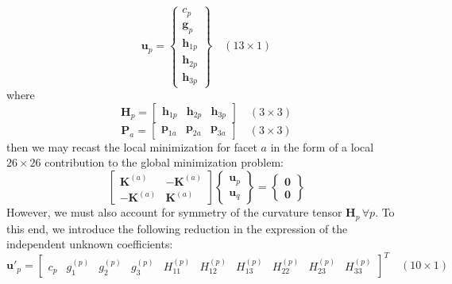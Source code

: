 \documentclass[11pt]{article} %
\begin{document}
\begin{equation}
	\mathbf{u}_p = \left\{ \begin{array}{c} c_p \\ \mathbf{g}_p \\ \mathbf{h}_{1p} \\ \mathbf{h}_{2p} \\ \mathbf{h}_{3p} \end{array} \right\} \quad (13 \times 1)
\end{equation}
where
\begin{equation}
	\mathbf{H}_p = \left[ \begin{array}{ccc} \mathbf{h}_{1p} & \mathbf{h}_{2p} & \mathbf{h}_{3p} \end{array} \right] \quad (3 \times 3)
\end{equation}
\begin{equation}
	\mathbf{P}_a = \left[ \begin{array}{ccc} \mathbf{p}_{1a} & \mathbf{p}_{2a} & \mathbf{p}_{3a} \end{array} \right] \quad (3 \times 3)
\end{equation}
then we may recast the local minimization for facet $a$ in the form of a local $26\times26$ contribution to the global minimization problem:
\begin{equation}
	\left[ \begin{array}{cc} \mathbf{K}^{(a)} & -\mathbf{K}^{(a)} \\ -\mathbf{K}^{(a)} & \mathbf{K}^{(a)} \end{array} \right] \left\{ \begin{array}{c} \mathbf{u}_p \\ \mathbf{u}_q \end{array} \right\} = \left\{ \begin{array}{c} \mathbf{0} \\ \mathbf{0} \end{array} \right\}
\end{equation}
However, we must also account for symmetry of the curvature tensor $\mathbf{H}_p \, \forall p$. To this end, we introduce the following reduction in the expression of the independent unknown coefficients:
\begin{equation}
	\mathbf{u}'_p =  \left[ \begin{array}{cccccccccc} c_p & g^{(p)}_{1} & g^{(p)}_{2} & g^{(p)}_{3} & H^{(p)}_{11} & H^{(p)}_{12} & H^{(p)}_{13} & H^{(p)}_{22} & H^{(p)}_{23} & H^{(p)}_{33} \end{array} \right]^T \quad (10 \times 1)
\end{equation}
\end{document}
